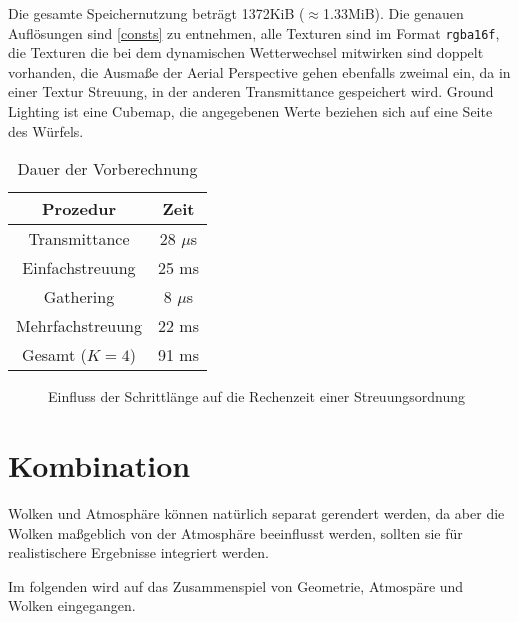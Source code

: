 Die gesamte Speichernutzung beträgt 1372KiB ($\approx$1.33MiB). Die genauen Auflösungen sind \cref{consts} zu
entnehmen, alle Texturen sind im Format \texttt{rgba16f}, die Texturen die bei dem dynamischen Wetterwechsel mitwirken
sind doppelt vorhanden, die Ausmaße der Aerial Perspective gehen ebenfalls zweimal ein, da in einer Textur Streuung, in
der anderen Transmittance gespeichert wird. Ground Lighting ist eine Cubemap, die angegebenen Werte beziehen sich auf
eine Seite des Würfels.

\begin{table}
\centering
	\begin{tabular}{| c | c |}
	\hline
	Prozedur & Zeit\\ \hline
	Transmittance & 28 $\mu$s\\
	Einfachstreuung & 25 ms\\
	Gathering & 8 $\mu$s\\
	Mehrfachstreuung & 22 ms \\ \hline
	Gesamt ($K=4$) & 91 ms \\ \hline
	\end{tabular}
\caption{Dauer der Vorberechnung}
\label{precomp_sloooow}
\end{table}

\begin{figure}
\centering
{}

\caption{Einfluss der Schrittlänge auf die Rechenzeit einer Streuungsordnung}
\label{steps}
\end{figure}

\clearpage
\part{Kombination}
Wolken und Atmosphäre können natürlich separat gerendert werden, da aber die Wolken maßgeblich von der Atmosphäre
beeinflusst werden, sollten sie für realistischere Ergebnisse integriert werden.

Im folgenden wird auf das Zusammenspiel von Geometrie, Atmospäre und Wolken eingegangen.
